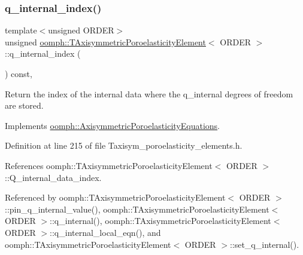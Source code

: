 \mbox{\label{classoomph_1_1TAxisymmetricPoroelasticityElement_a53999a350be9bf4320a19750dd85e71b}} 
\subsubsection{\texorpdfstring{q\+\_\+internal\+\_\+index()}{q\_internal\_index()}}
{\footnotesize\ttfamily template$<$unsigned O\+R\+D\+ER$>$ \\
unsigned \hyperlink{classoomph_1_1TAxisymmetricPoroelasticityElement}{oomph\+::\+T\+Axisymmetric\+Poroelasticity\+Element}$<$ O\+R\+D\+ER $>$\+::q\+\_\+internal\+\_\+index (\begin{DoxyParamCaption}{ }\end{DoxyParamCaption}) const\hspace{0.3cm}{\ttfamily [inline]}, {\ttfamily [virtual]}}



Return the index of the internal data where the q\+\_\+internal degrees of freedom are stored. 



Implements \hyperlink{classoomph_1_1AxisymmetricPoroelasticityEquations_a0c4a88ea26b89ce26aac6a04c21496dd}{oomph\+::\+Axisymmetric\+Poroelasticity\+Equations}.



Definition at line 215 of file Taxisym\+\_\+poroelasticity\+\_\+elements.\+h.



References oomph\+::\+T\+Axisymmetric\+Poroelasticity\+Element$<$ O\+R\+D\+E\+R $>$\+::\+Q\+\_\+internal\+\_\+data\+\_\+index.



Referenced by oomph\+::\+T\+Axisymmetric\+Poroelasticity\+Element$<$ O\+R\+D\+E\+R $>$\+::pin\+\_\+q\+\_\+internal\+\_\+value(), oomph\+::\+T\+Axisymmetric\+Poroelasticity\+Element$<$ O\+R\+D\+E\+R $>$\+::q\+\_\+internal(), oomph\+::\+T\+Axisymmetric\+Poroelasticity\+Element$<$ O\+R\+D\+E\+R $>$\+::q\+\_\+internal\+\_\+local\+\_\+eqn(), and oomph\+::\+T\+Axisymmetric\+Poroelasticity\+Element$<$ O\+R\+D\+E\+R $>$\+::set\+\_\+q\+\_\+internal().

